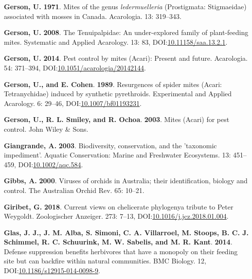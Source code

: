 \documentclass[12pt,final,CPage]{ufthesis}
\newlength{\cslhangindent}
\newenvironment{CSLReferences}[2] %
{%
	\setlength{\parindent}{0pt}
	\ifodd #1 \everypar{\setlength{\hangindent}{\cslhangindent}}\ignorespaces\fi
	\ifnum #2 > 0
	\setlength{\parskip}{#2\baselineskip}
	\fi
}%
{}
\begin{document}
{\begin{CSLReferences}{1}{0}
  \leavevmode{}%
  \textbf{Gerson, U.} \textbf{1971}. Mites of the genus \emph{ledermuelleria} ({Prostigmata}: {Stigmaeidae}) associated with mosses in {Canada}. Acarologia. 13: 319--343.

  \leavevmode{}%
  \textbf{Gerson, U.} \textbf{2008}. The {Tenuipalpidae}: An under-explored family of plant-feeding mites. Systematic and Applied Acarology. 13: 83, DOI:\href{https://doi.org/10.11158/saa.13.2.1}{10.11158/saa.13.2.1}.

  \leavevmode{}%
  \textbf{Gerson, U.} \textbf{2014}. Pest control by mites ({Acari}): Present and future. Acarologia. 54: 371--394, DOI:\href{https://doi.org/10.1051/acarologia/20142144}{10.1051/acarologia/20142144}.

  \leavevmode{}%
  \textbf{Gerson, U., and E. Cohen}. \textbf{1989}. Resurgences of spider mites ({Acari}: {Tetranychidae}) induced by synthetic pyrethroids. Experimental and Applied Acarology. 6: 29--46, DOI:\href{https://doi.org/10.1007/bf01193231}{10.1007/bf01193231}.

  \leavevmode{}%
  \textbf{Gerson, U., R. L. Smiley, and R. Ochoa}. \textbf{2003}. Mites ({Acari}) for pest control. John Wiley \& Sons.

  \leavevmode{}%
  \textbf{Giangrande, A.} \textbf{2003}. Biodiversity, conservation, and the 'taxonomic impediment'. Aquatic Conservation: Marine and Freshwater Ecosystems. 13: 451--459, DOI:\href{https://doi.org/10.1002/aqc.584}{10.1002/aqc.584}.

  \leavevmode{}%
  \textbf{Gibbs, A.} \textbf{2000}. Viruses of orchids in {Australia}; their identification, biology and control. The {Australia}n Orchid Rev. 65: 10--21.

  \leavevmode{}%
  \textbf{Giribet, G.} \textbf{2018}. Current views on chelicerate phylogeny{\textemdash}a tribute to {Peter Weygoldt}. Zoologischer Anzeiger. 273: 7--13, DOI:\href{https://doi.org/10.1016/j.jcz.2018.01.004}{10.1016/j.jcz.2018.01.004}.

  \leavevmode{}%
  \textbf{Glas, J. J., J. M. Alba, S. Simoni, C. A. Villarroel, M. Stoops, B. C. J. Schimmel, R. C. Schuurink, M. W. Sabelis, and M. R. Kant}. \textbf{2014}. Defense suppression benefits herbivores that have a monopoly on their feeding site but can backfire within natural communities. {BMC} Biology. 12, DOI:\href{https://doi.org/10.1186/s12915-014-0098-9}{10.1186/s12915-014-0098-9}.


\end{CSLReferences}}
\end{document}

